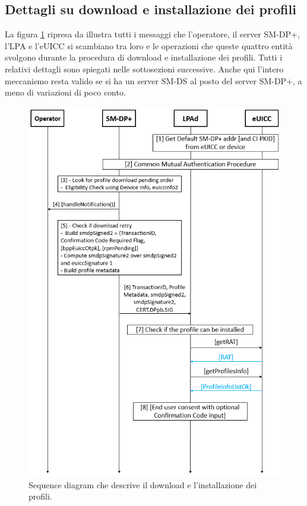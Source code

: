 \documentclass[10pt, oneside]{book}
\begin{document}
\subsection{Dettagli su download e installazione dei profili}\label{sec:down-install}
La figura \ref{fig:download-install} ripresa da \cite{GSMA-docs-new} illustra tutti i messaggi che l'operatore, il server SM-DP+, l'LPA e l'eUICC si scambiano tra loro e le operazioni che queste quattro entità svolgono durante la procedura di download e installazione dei profili. Tutti i relativi dettagli \cite{GSMA-docs-new} sono spiegati nelle sottosezioni successive. Anche qui l'intero meccanismo resta valido se si ha un server SM-DS al posto del server SM-DP+, a meno di variazioni di poco conto.
\begin{figure}
\includegraphics[width=\linewidth]{download-install.png}
\caption{Sequence diagram che descrive il download e l'installazione dei profili.}
\label{fig:download-install}
\end{figure}
\end{document}
